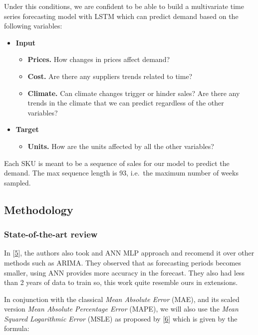 \documentclass[]{article}
\providecommand{\tightlist}{%
  \setlength{\itemsep}{0pt}\setlength{\parskip}{0pt}}
\theoremstyle{definition}
\theoremstyle{definition}
\theoremstyle{definition}
\theoremstyle{remark}
\begin{document}
Under this conditions, we are confident to be able to build a
multivariate time series forecasting model with LSTM which can predict
demand based on the following variables:

\begin{itemize}
\tightlist
\item
  \textbf{Input}

  \begin{itemize}
  \tightlist
  \item
    \textbf{Prices.} How changes in prices affect demand?
  \item
    \textbf{Cost.} Are there any suppliers trends related to time?
  \item
    \textbf{Climate.} Can climate changes trigger or hinder sales? Are
    there any trends in the climate that we can predict regardless of
    the other variables?
  \end{itemize}
\item
  \textbf{Target}

  \begin{itemize}
  \tightlist
  \item
    \textbf{Units.} How are the units affected by all the other
    variables?
  \end{itemize}
\end{itemize}

Each SKU is meant to be a sequence of sales for our model to predict the
demand. The max sequence length is 93, i.e.~the maximum number of weeks
sampled.

\subsection{Methodology}\label{methodology}

\subsubsection{State-of-the-art review}\label{state-of-the-art-review}

In {[}\protect\hyperlink{ref-Kochak2015}{5}{]}, the authors also took
and ANN MLP approach and recomend it over other methods such as ARIMA.
They observed that as forecasting periods becomes smaller, using ANN
provides more accuracy in the forecast. They also had less than 2 years
of data to train so, this work quite resemble ours in extensions.

In conjunction with the classical \emph{Mean Absolute Error} (MAE), and
its scaled version \emph{Mean Absolute Percentage Error} (MAPE), we will
also use the \emph{Mean Squared Logarithmic Error} (MSLE) as proposed by
{[}\protect\hyperlink{ref-Taghizadeh2017}{6}{]} which is given by the
formula:
\end{document}
